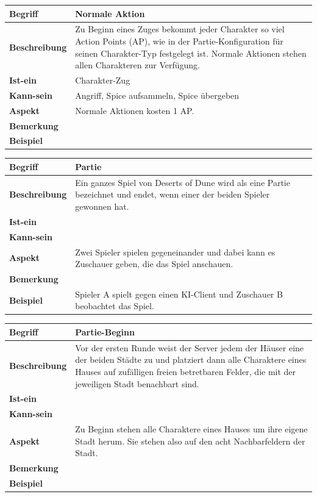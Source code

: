 \documentclass{uulm-assignment}
\begin{document}
\begin{tabularx}{16cm}{|l|X|}
\hline
\textbf{Begriff} & \textbf{Normale Aktion} \\
\hline
\textbf{Beschreibung} & Zu Beginn eines Zuges bekommt jeder Charakter so viel Action Points (AP), wie in der Partie-Konfiguration für seinen Charakter-Typ festgelegt ist. Normale Aktionen stehen allen Charakteren zur Verfügung.\\
\hline
\textbf{Ist-ein} & Charakter-Zug\\
\hline
\textbf{Kann-sein} & Angriff, Spice aufsammeln, Spice übergeben\\
\hline
\textbf{Aspekt} & Normale Aktionen kosten 1 AP.\\
\hline
\textbf{Bemerkung} &  \\
\hline
\textbf{Beispiel} &  \\
\hline
\end{tabularx}

\begin{tabularx}{16cm}{|l|X|}
\hline
\textbf{Begriff} & \textbf{Partie} \\
\hline
\textbf{Beschreibung} & Ein ganzes Spiel von Deserts of Dune wird als eine Partie bezeichnet und endet, wenn einer der beiden Spieler gewonnen hat. \\
\hline
\textbf{Ist-ein} & \\
\hline
\textbf{Kann-sein} & \\
\hline
\textbf{Aspekt} & Zwei Spieler spielen gegeneinander und dabei kann es Zuschauer geben, die das Spiel anschauen.\\
\hline
\textbf{Bemerkung} &  \\
\hline
\textbf{Beispiel} & Spieler A spielt gegen einen KI-Client und Zuschauer B beobachtet das Spiel. \\
\hline
\end{tabularx}

\begin{tabularx}{16cm}{|l|X|}
\hline
\textbf{Begriff} & \textbf{Partie-Beginn} \\
\hline
\textbf{Beschreibung} & Vor der ersten Runde weist der Server jedem der Häuser eine der beiden Städte zu und platziert dann alle Charaktere eines Hauses auf zufälligen freien betretbaren Felder, die mit der jeweiligen Stadt benachbart sind. \\
\hline
\textbf{Ist-ein} & \\
\hline
\textbf{Kann-sein} & \\
\hline
\textbf{Aspekt} & Zu Beginn stehen alle Charaktere eines Hauses um ihre eigene Stadt herum. Sie stehen also auf den acht Nachbarfeldern der Stadt.\\
\hline
\textbf{Bemerkung} &  \\
\hline
\textbf{Beispiel} &  \\
\hline
\end{tabularx}
\end{document}
